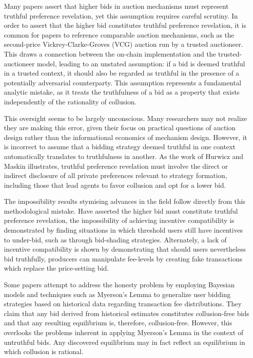 \documentclass[oneside]{article}   	%
\begin{document}
Many papers assert that higher bids in auction mechanisms must represent truthful preference revelation, yet this assumption requires careful scrutiny. In order to assert that the higher bid constitutes truthful preference revelation, it is common for papers to reference comparable auction mechanisms, such as the second-price Vickrey-Clarke-Groves (VCG) auction run by a trusted auctioneer. This draws a connection between the on-chain implementation and the trusted-auctioneer model, leading to an unstated assumption: if a bid is deemed truthful in a trusted context, it should also be regarded as truthful in the presence of a potentially adversarial counterparty. This assumption represents a fundamental analytic mistake, as it treats the truthfulness of a bid as a property that exists independently of the rationality of collusion.

This oversight seems to be largely unconscious. Many researchers may not realize they are making this error, given their focus on practical questions of auction design rather than the informational economics of mechanism design. However, it is incorrect to assume that a bidding strategy deemed truthful in one context automatically translates to truthfulness in another. As the work of Hurwicz and Maskin illustrates, truthful preference revelation must involve the direct or indirect disclosure of all private preferences relevant to strategy formation, including those that lead agents to favor collusion and opt for a lower bid.

The impossibility results stymieing advances in the field follow directly from this methodological mistake. Have asserted the higher bid must constitute truthful preference revelation, the impossibility of achieving incentive compatibility is demonstrated by finding situations in which threshold users still have incentives to under-bid, such as through bid-shading strategies. Alternately, a lack of incentive compatibility is shown by demonstrating that should users nevertheless bid truthfully, producers can manipulate fee-levels by creating fake transactions which replace the price-setting bid.

Some papers attempt to address the honesty problem by employing Bayesian models and techniques such as Myerson's Lemma to generalize user bidding strategies based on historical data regarding transaction fee distributions. They claim that any bid derived from historical estimates constitutes collusion-free bids and that any resulting equilibrium is, therefore, collusion-free. However, this overlooks the problems inherent in applying Myerson's Lemma in the context of untruthful bids. Any discovered equilibrium may in fact reflect an equilibrium in which collusion is rational.
\end{document}
